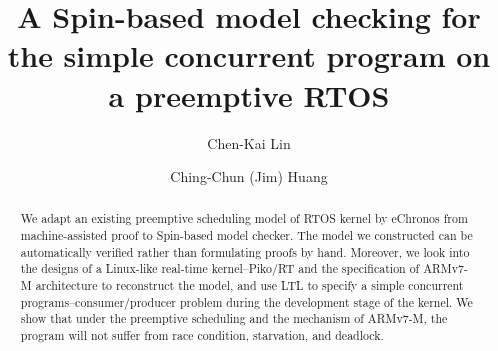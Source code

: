 \documentclass[sigconf]{acmart}
\begin{document}
\title{A Spin-based model checking for the simple concurrent program on a preemptive RTOS}


\author{Chen-Kai Lin}

\author{Ching-Chun (Jim) Huang}

\renewcommand{\shortauthors}{C.K. Lin and Jim Huang}


\begin{abstract}
We adapt an existing preemptive scheduling model of RTOS kernel by eChronos from machine-assisted proof to Spin-based model checker. The model we constructed can be automatically verified rather than formulating proofs by hand. Moreover, we look into the designs of a Linux-like real-time kernel--Piko/RT and the specification of ARMv7-M architecture to reconstruct the model, and use LTL to specify a simple concurrent programs--consumer/producer problem during the development stage of the kernel. We show that under the preemptive scheduling and the mechanism of ARMv7-M, the program will not suffer from race condition, starvation, and deadlock.
\end{abstract}



\maketitle





\end{document}
